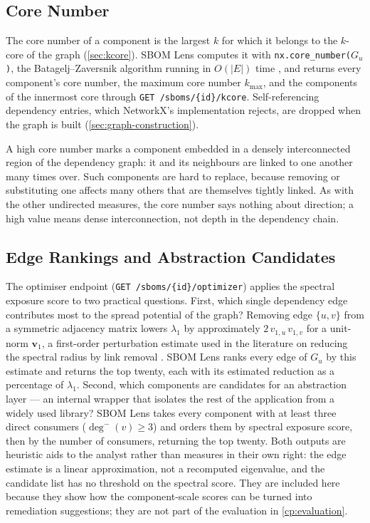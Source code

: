 \subsection{Core Number}
\label{sec:ns-kcore}

The core number of a component is the largest \(k\) for which it belongs to the \(k\)-core of the graph (\autoref{sec:kcore}). SBOM Lens computes it with \texttt{nx.core\_number(}\(G_u\)\texttt{)}, the Batagelj--Zaversnik algorithm running in \(O(|E|)\) time \citep{Batagelj2003}, and returns every component's core number, the maximum core number \(k_{\max}\), and the components of the innermost core through \texttt{GET /sboms/\{id\}/kcore}. Self-referencing dependency entries, which NetworkX's implementation rejects, are dropped when the graph is built (\autoref{sec:graph-construction}).

A high core number marks a component embedded in a densely interconnected region of the dependency graph: it and its neighbours are linked to one another many times over. Such components are hard to replace, because removing or substituting one affects many others that are themselves tightly linked. As with the other undirected measures, the core number says nothing about direction; a high value means dense interconnection, not depth in the dependency chain.


\subsection{Edge Rankings and Abstraction Candidates}
\label{sec:ns-optimizer}

The optimiser endpoint (\texttt{GET /sboms/\{id\}/optimizer}) applies the spectral exposure score to two practical questions. First, which single dependency edge contributes most to the spread potential of the graph? Removing edge \(\{u, v\}\) from a symmetric adjacency matrix lowers \(\lambda_1\) by approximately \(2\,v_{1,u}\,v_{1,v}\) for a unit-norm \(\mathbf{v}_1\), a first-order perturbation estimate used in the literature on reducing the spectral radius by link removal \citep{VanMieghem2011}. SBOM Lens ranks every edge of \(G_u\) by this estimate and returns the top twenty, each with its estimated reduction as a percentage of \(\lambda_1\). Second, which components are candidates for an abstraction layer --- an internal wrapper that isolates the rest of the application from a widely used library? SBOM Lens takes every component with at least three direct consumers (\(\deg^-(v) \geq 3\)) and orders them by spectral exposure score, then by the number of consumers, returning the top twenty. Both outputs are heuristic aids to the analyst rather than measures in their own right: the edge estimate is a linear approximation, not a recomputed eigenvalue, and the candidate list has no threshold on the spectral score. They are included here because they show how the component-scale scores can be turned into remediation suggestions; they are not part of the evaluation in \autoref{cp:evaluation}.


